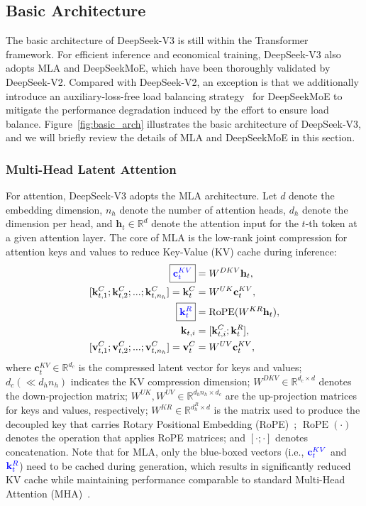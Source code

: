 \documentclass[11pt, a4paper, logo, copyright, nonumbering]{deepseek}
\newcommand{\dsvii}{DeepSeek-V2}
\newcommand{\dsattn}{MLA}
\newcommand{\dsmoe}{DeepSeekMoE}
\newcommand{\dsviii}{DeepSeek-V3}
\begin{document}
\begin{CJK*}{UTF8}{gbsn}
\subsection{Basic Architecture}

The basic architecture of \dsviii{} is still within the Transformer~\citep{transformer} framework. 
For efficient inference and economical training, \dsviii{} also adopts \dsattn{} and \dsmoe{}, which have been thoroughly validated by \dsvii{}. 
Compared with \dsvii{}, an exception is that we additionally introduce an auxiliary-loss-free load balancing strategy~\citep{noaux_tc} for \dsmoe{} to mitigate the performance degradation induced by the effort to ensure load balance. 
Figure~\ref{fig:basic_arch} illustrates the basic architecture of \dsviii{}, and we will briefly review the details of MLA and DeepSeekMoE in this section. 

\subsubsection{Multi-Head Latent Attention}

For attention, \dsviii{} adopts the \dsattn{} architecture. 
Let $d$ denote the embedding dimension, $n_h$ denote the number of attention heads, $d_h$ denote the dimension per head, and $\mathbf{h}_{t} \in \mathbb{R}^{d}$ denote the attention input for the $t$-th token at a given attention layer.
The core of \dsattn{} is the low-rank joint compression for attention keys and values to reduce Key-Value (KV) cache during inference:
\begin{align}
    \boxed{\color{blue} \mathbf{c}_{t}^{KV}} &= W^{DKV} \mathbf{h}_{t}, \\
    [\mathbf{k}_{t, 1}^{C};\mathbf{k}_{t, 2}^{C};...;\mathbf{k}_{t, n_{h}}^{C}] = \mathbf{k}_{t}^{C} &= W^{UK} \mathbf{c}_{t}^{KV}, \\
    \boxed{\color{blue}\mathbf{k}_{t}^{R}} &= \operatorname{RoPE}({W^{KR}} \mathbf{h}_{t}), \\
    \mathbf{k}_{t, i} &= [\mathbf{k}_{t, i}^{C}; \mathbf{k}_{t}^{R}], \\
    [\mathbf{v}_{t, 1}^{C};\mathbf{v}_{t, 2}^{C};...;\mathbf{v}_{t, n_{h}}^{C}] = \mathbf{v}_{t}^{C} &= W^{UV} \mathbf{c}_{t}^{KV}, 
\end{align}
where $\mathbf{c}_{t}^{KV} \in \mathbb{R}^{d_c}$ is the compressed latent vector for keys and values; 
$d_c (\ll d_h n_h)$ indicates the KV compression dimension;
$W^{DKV} \in \mathbb{R}^{d_c \times d}$ denotes the down-projection matrix;
$W^{UK},W^{UV} \in \mathbb{R}^{d_h n_h \times d_c}$ are the up-projection matrices for keys and values, respectively;
$W^{KR} \in \mathbb{R}^{d_h^R \times d}$ is the matrix used to produce the decoupled key that carries Rotary Positional Embedding (RoPE)~\citep{su2024roformer}; 
$\operatorname{RoPE}(\cdot)$ denotes the operation that applies RoPE matrices; 
and $[\cdot;\cdot]$ denotes concatenation.
Note that for MLA, only the blue-boxed vectors (i.e., $\color{blue} \mathbf{c}_{t}^{KV}$ and $\color{blue}\mathbf{k}_{t}^{R}$) need to be cached during generation, which results in significantly reduced KV cache while maintaining performance comparable to standard Multi-Head Attention (MHA)~\citep{transformer}.


\end{CJK*}
\end{document}
